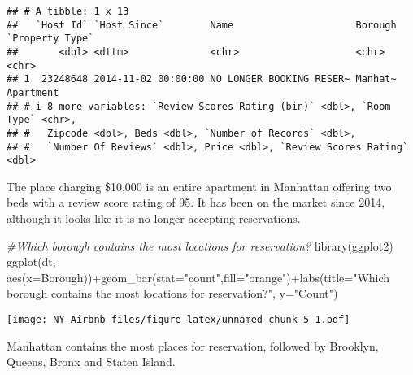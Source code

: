 \documentclass[
]{article}
\newenvironment{Shaded}{\begin{snugshade}}{\end{snugshade}}
\newcommand{\AttributeTok}[1]{\textcolor[rgb]{0.77,0.63,0.00}{#1}}
\newcommand{\CommentTok}[1]{\textcolor[rgb]{0.56,0.35,0.01}{\textit{#1}}}
\newcommand{\FunctionTok}[1]{\textcolor[rgb]{0.00,0.00,0.00}{#1}}
\newcommand{\NormalTok}[1]{#1}
\newcommand{\SpecialCharTok}[1]{\textcolor[rgb]{0.00,0.00,0.00}{#1}}
\newcommand{\StringTok}[1]{\textcolor[rgb]{0.31,0.60,0.02}{#1}}
\begin{document}
\begin{verbatim}
## # A tibble: 1 x 13
##   `Host Id` `Host Since`        Name                     Borough `Property Type`
##       <dbl> <dttm>              <chr>                    <chr>   <chr>          
## 1  23248648 2014-11-02 00:00:00 NO LONGER BOOKING RESER~ Manhat~ Apartment      
## # i 8 more variables: `Review Scores Rating (bin)` <dbl>, `Room Type` <chr>,
## #   Zipcode <dbl>, Beds <dbl>, `Number of Records` <dbl>,
## #   `Number Of Reviews` <dbl>, Price <dbl>, `Review Scores Rating` <dbl>
\end{verbatim}

The place charging \$10,000 is an entire apartment in Manhattan offering
two beds with a review score rating of 95. It has been on the market
since 2014, although it looks like it is no longer accepting
reservations.

\begin{Shaded}
\begin{Highlighting}[]
\CommentTok{\#Which borough contains the most locations for reservation?}
\FunctionTok{library}\NormalTok{(ggplot2)}
\FunctionTok{ggplot}\NormalTok{(dt, }\FunctionTok{aes}\NormalTok{(}\AttributeTok{x=}\NormalTok{Borough))}\SpecialCharTok{+}\FunctionTok{geom\_bar}\NormalTok{(}\AttributeTok{stat=}\StringTok{"count"}\NormalTok{,}\AttributeTok{fill=}\StringTok{"orange"}\NormalTok{)}\SpecialCharTok{+}\FunctionTok{labs}\NormalTok{(}\AttributeTok{title=}\StringTok{"Which borough contains the most locations for reservation?"}\NormalTok{, }\AttributeTok{y=}\StringTok{"Count"}\NormalTok{)}
\end{Highlighting}
\end{Shaded}

\texttt{[image: NY-Airbnb\_files/figure-latex/unnamed-chunk-5-1.pdf]}

Manhattan contains the most places for reservation, followed by
Brooklyn, Queens, Bronx and Staten Island.

\begin{Shaded}
\end{Shaded}
\end{document}
